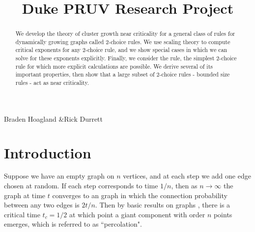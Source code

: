 \documentclass[twoside,10pt]{article}
\begin{document}

\title{Duke PRUV Research Project}{Braden Hoagland \quad\&\quad Rick Durrett}

\begin{abstract}
	We develop the theory of cluster growth near criticality for a general class of rules for dynamically growing graphs called 2-choice rules. We use scaling theory to compute critical exponents for any 2-choice rule, and we show special cases in which we can solve for these exponents explicitly. Finally, we consider the \ER rule, the simplest 2-choice rule for which more explicit calculations are possible. We derive several of its important properties, then show that a large subset of 2-choice rules - bounded size rules - act as \ER near criticality.
\end{abstract}

\section{Introduction}

Suppose we have an empty graph on $n$ vertices, and at each step we add one edge chosen at random. If each step corresponds to time $1/n$, then as $n\to \infty$ the graph at time $t$ converges to an \ER graph in which the connection probability between any two edges is $2t/n$. Then by basic results on \ER graphs \cite{ER}, there is a critical time $t_{c}=1/2$ at which point a giant component with order $n$ points emerges, which is referred to as ``percolation".
\end{document}
